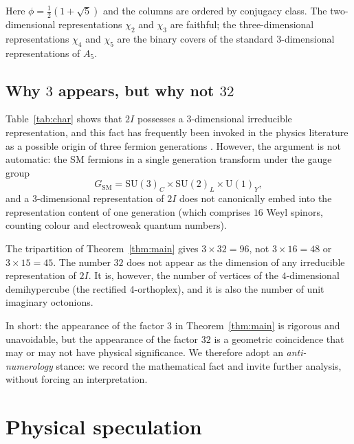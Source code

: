 \documentclass[10pt,reqno]{amsart}
\theoremstyle{plain}
\theoremstyle{definition}
\begin{document}
Here $\phi = \frac12(1+\sqrt5)$ and the columns are ordered by conjugacy class. The two-dimensional representations $\chi_2$ and $\chi_3$ are faithful; the three-dimensional representations $\chi_4$ and $\chi_5$ are the binary covers of the standard $3$-dimensional representations of $A_5$.

\subsection{Why $3$ appears, but why not $32$}

Table~\ref{tab:char} shows that $2I$ possesses a $3$-dimensional irreducible representation, and this fact has frequently been invoked in the physics literature as a possible origin of three fermion generations \cite{Wilson2021,KingFarnsworth2018}. However, the argument is not automatic: the SM fermions in a single generation transform under the gauge group
\begin{equation}
G_{\text{SM}} = \mathrm{SU}(3)_C \times \mathrm{SU}(2)_L \times \mathrm{U}(1)_Y,
\end{equation}
and a $3$-dimensional representation of $2I$ does not canonically embed into the representation content of one generation (which comprises $16$ Weyl spinors, counting colour and electroweak quantum numbers).

The tripartition of Theorem~\ref{thm:main} gives $3 \times 32 = 96$, not $3 \times 16 = 48$ or $3 \times 15 = 45$. The number $32$ does not appear as the dimension of any irreducible representation of $2I$. It is, however, the number of vertices of the $4$-dimensional demihypercube (the rectified 4-orthoplex), and it is also the number of unit imaginary octonions.

In short: the appearance of the factor $3$ in Theorem~\ref{thm:main} is rigorous and unavoidable, but the appearance of the factor $32$ is a geometric coincidence that may or may not have physical significance. We therefore adopt an \emph{anti-numerology} stance: we record the mathematical fact and invite further analysis, without forcing an interpretation.

\section{Physical speculation}\label{sec:speculation}
\end{document}
